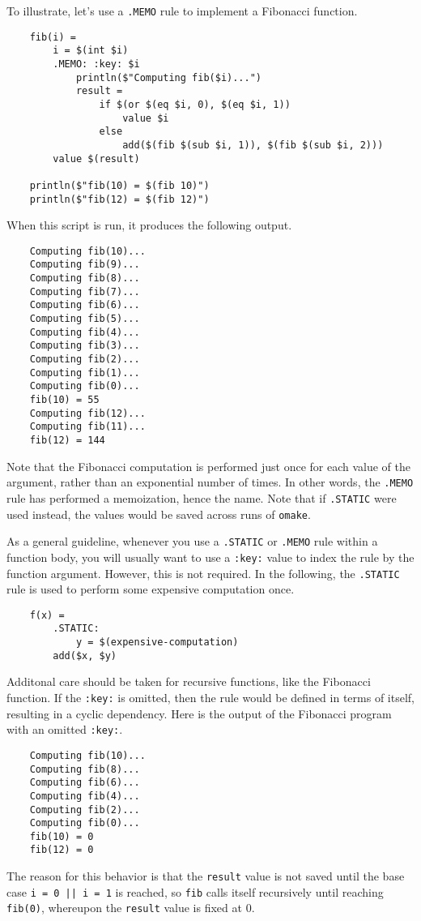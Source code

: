 To illustrate, let's use a \verb+.MEMO+ rule to implement a Fibonacci function.

\begin{verbatim}
    fib(i) =
        i = $(int $i)
        .MEMO: :key: $i
            println($"Computing fib($i)...")
            result =
                if $(or $(eq $i, 0), $(eq $i, 1))
                    value $i
                else
                    add($(fib $(sub $i, 1)), $(fib $(sub $i, 2)))
        value $(result)

    println($"fib(10) = $(fib 10)")
    println($"fib(12) = $(fib 12)")
\end{verbatim}
%
When this script is run, it produces the following output.

\begin{verbatim}
    Computing fib(10)...
    Computing fib(9)...
    Computing fib(8)...
    Computing fib(7)...
    Computing fib(6)...
    Computing fib(5)...
    Computing fib(4)...
    Computing fib(3)...
    Computing fib(2)...
    Computing fib(1)...
    Computing fib(0)...
    fib(10) = 55
    Computing fib(12)...
    Computing fib(11)...
    fib(12) = 144
\end{verbatim}
%
Note that the Fibonacci computation is performed just once for each value of the argument, rather
than an exponential number of times.  In other words, the \verb+.MEMO+ rule has performed a
memoization, hence the name.  Note that if \verb+.STATIC+ were used instead, the values would be
saved across runs of \verb+omake+.

As a general guideline, whenever you use a \verb+.STATIC+ or \verb+.MEMO+ rule within a function
body, you will usually want to use a \verb+:key:+ value to index the rule by the function argument.
However, this is not required.  In the following, the \verb+.STATIC+ rule is used to perform some
expensive computation once.

\begin{verbatim}
    f(x) =
        .STATIC:
            y = $(expensive-computation)
        add($x, $y)
\end{verbatim}

Additonal care should be taken for recursive functions, like the Fibonacci function.  If the
\verb+:key:+ is omitted, then the rule would be defined in terms of itself, resulting in a cyclic
dependency.  Here is the output of the Fibonacci program with an omitted \verb+:key:+.

\begin{verbatim}
    Computing fib(10)...
    Computing fib(8)...
    Computing fib(6)...
    Computing fib(4)...
    Computing fib(2)...
    Computing fib(0)...
    fib(10) = 0
    fib(12) = 0
\end{verbatim}
%
The reason for this behavior is that the \verb+result+ value is not saved until the base case
\verb+i = 0 || i = 1+ is reached, so \verb+fib+ calls itself recursively until reaching
\verb+fib(0)+, whereupon the \verb+result+ value is fixed at 0.

